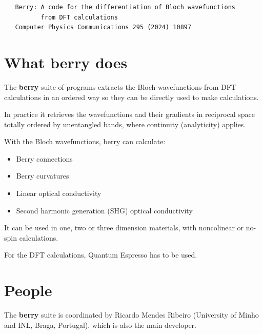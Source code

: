 \documentclass[a4paper,12pt]{report}
\begin{document}
 \begin{verbatim}
   Berry: A code for the differentiation of Bloch wavefunctions
          from DFT calculations
   Computer Physics Communications 295 (2024) 10897
 \end{verbatim}



\section{What \textbf{berry} does}

The \textbf{berry} suite of programs extracts the Bloch wavefunctions from DFT calculations in an ordered way
so they can be directly used to make calculations.

In practice it retrieves the wavefunctions and their gradients in reciprocal space totally ordered
by unentangled bands, where continuity (analyticity) applies.

With the Bloch wavefunctions, berry can calculate:
\begin{itemize}
  \item Berry connections
  \item Berry curvatures
  \item Linear optical conductivity
  \item Second harmonic generation (SHG) optical conductivity
\end{itemize}

It can be used in one, two or three dimension materials, with noncolinear or no-spin calculations.

For the DFT calculations, {\sc Quantum Espresso}\cite{Giannozzi2009,Giannozzi2017} has to be used.




\newpage
\section{People}

The \textbf{berry} suite is coordinated by Ricardo Mendes Ribeiro (University of Minho and INL, Braga, Portugal),
which is also the main developer.\medskip
\end{document}
